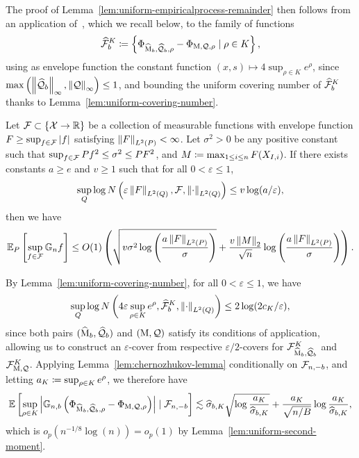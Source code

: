 The proof of Lemma~\ref{lem:uniform-empiricalprocess-remainder} then follows from an application of~\citet[Lemma 6.2]{ChernozhukovChDeDuHaNeRo16}, which we recall below,  to the family of functions
\begin{align*}
\widehat{\mathcal{F}}_b^K \coloneqq \left\{ \Phi_{\widehat{\operatorname*{M}}_b, \widehat{\mathcal{Q}}_b, \rho} - \Phi_{\operatorname*{M},  \mathcal{Q}, \rho} \mid \rho \in K \right\},
\end{align*}
using as envelope function the constant function $(x,s) \mapsto 4\sup_{\rho\in K} e^\rho$, since $\max\left(\left\|{\widehat{\mathcal{Q}}_b}\right\|_\infty, \left\|{\mathcal{Q}}\right\|_\infty \right) \le 1$, and bounding the uniform covering number of $\widehat{\mathcal{F}}_b^K$ thanks to Lemma~\ref{lem:uniform-covering-number}.

\begin{lemma}
\label{lem:chernozhukov-lemma}
Let $\mathcal{F} \subset \{ \mathcal{X} \to \mathbb{R} \}$ be a collection of measurable functions with envelope function $F \ge \sup_{f \in \mathcal{F}} |f|$ satisfying $\left\|{F}\right\|_{L^2(P)} < \infty$. Let $\sigma^2 >0$ be any positive constant such that $\sup_{f \in \mathcal{F}} Pf^2  \le \sigma^2 \le PF^2$, and $M \coloneqq \max_{1\le i \le n} F(X_{I,i})$.
If there exists constants $a \ge e$ and $v \ge 1$ such that for all $0<\varepsilon \le 1$,
\begin{align*}
\sup_Q \log N \left( \varepsilon \left\|{F}\right\|_{L^2(Q)},  \mathcal{F},  \left\|{\cdot}\right\|_{L^2(Q)} \right) \le v \log(a/\varepsilon),
\end{align*}
then we have
\begin{align*}
\mathbb{E}_P\left[ \sup_{f \in \mathcal{F}} \mathbb{G}_n f \right] \le O(1)\left( \sqrt{v \sigma^2 \log \left( \frac{a \left\|{F}\right\|_{L^2(P)}}{\sigma} \right)} + \frac{v \left\|{M}\right\|_{2}}{\sqrt{n}}\log \left( \frac{a \left\|{F}\right\|_{L^2(P)}}{\sigma} \right)   \right) .
\end{align*}
\end{lemma}
By Lemma~\ref{lem:uniform-covering-number},  for all $0< \varepsilon \le 1$, we have 
\begin{align*}
\sup_Q \log N \left(4 \varepsilon \sup_{\rho \in K} e^{\rho},  \widehat{\mathcal{F}}_b^K,  \left\|{\cdot}\right\|_{L^2(Q)} \right) \le 2 \log(2c_K/\varepsilon),
\end{align*}
since both pairs $(\widehat{\operatorname*{M}}_b, \widehat{\mathcal{Q}}_b)$ and $(\operatorname*{M}, \mathcal{Q})$ satisfy its conditions of application, allowing us to construct an $\varepsilon$-cover from respective $\varepsilon/2$-covers for $\mathcal{F}^K_{\widehat{\operatorname*{M}}_b, \widehat{\mathcal{Q}}_b}$ and $\mathcal{F}^K_{\operatorname*{M}, \mathcal{Q}}$.
Applying Lemma~\ref{lem:chernozhukov-lemma} conditionally on $\mathcal{F}_{n,-b}$,  and letting $a_K \coloneqq \sup_{\rho\in K} e^\rho$,  we therefore have
\begin{align*}
\mathbb{E}\left[ \sup_{\rho \in K} \left|  \mathbb{G}_{n,b}\left( \Phi_{\widehat{\operatorname*{M}}_b, \widehat{\mathcal{Q}}_b, \rho} - \Phi_{\operatorname*{M},  \mathcal{Q}, \rho} \right) \right| \mid \mathcal{F}_{n,-b} \right] \lesssim \widehat{\sigma}_{b,K}\sqrt{\log \frac{a_K}{\widehat{\sigma}_{b,K}}} + \frac{a_K}{\sqrt{n/B}}\log \frac{a_K}{\widehat{\sigma}_{b,K}},
\end{align*}
which is $o_p(n^{-1/8}\log(n)) = o_p(1)$ by Lemma~\ref{lem:uniform-second-moment}.

